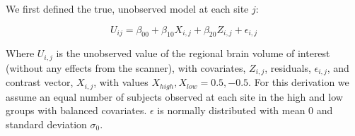 We first defined the true, unobserved model at each site $j$:

\begin{equation}
U_{ij} = \beta_{00} + \beta_{10}X_{i,j} + \beta_{20}Z_{i,j} + \epsilon_{i,j}
\end{equation}

Where $U_{i,j}$ is the unobserved value of the regional brain volume of interest (without any effects from the scanner), with covariates, $Z_{i,j}$, residuals, $\epsilon_{i,j}$, and contrast vector, $X_{i,j}$, with values $X_{high}, X_{low} = 0.5,-0.5$. For this derivation we assume an equal number of subjects observed at each site in the high and low groups with balanced covariates. $\epsilon$ is normally distributed with mean 0 and standard deviation $\sigma_0$. 